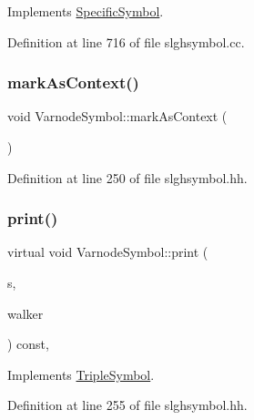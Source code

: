 Implements \mbox{\hyperlink{class_specific_symbol_abbde46a1f6af6c373420773d45e1e4e2}{Specific\+Symbol}}.



Definition at line 716 of file slghsymbol.\+cc.

\mbox{\label{class_varnode_symbol_a247dfc7a93f9da6491c457f3fbe097e9}} 
\subsubsection{\texorpdfstring{markAsContext()}{markAsContext()}}
{\footnotesize\ttfamily void Varnode\+Symbol\+::mark\+As\+Context (\begin{DoxyParamCaption}\item[{void}]{ }\end{DoxyParamCaption})\hspace{0.3cm}{\ttfamily [inline]}}



Definition at line 250 of file slghsymbol.\+hh.

\mbox{\label{class_varnode_symbol_a10b765544964a8f2b84072676fc945ff}} 
\subsubsection{\texorpdfstring{print()}{print()}}
{\footnotesize\ttfamily virtual void Varnode\+Symbol\+::print (\begin{DoxyParamCaption}\item[{ostream \&}]{s,  }\item[{\mbox{\hyperlink{class_parser_walker}{Parser\+Walker}} \&}]{walker }\end{DoxyParamCaption}) const\hspace{0.3cm}{\ttfamily [inline]}, {\ttfamily [virtual]}}



Implements \mbox{\hyperlink{class_triple_symbol_a205c4487d3ad54532097dd77eb4501fc}{Triple\+Symbol}}.



Definition at line 255 of file slghsymbol.\+hh.

